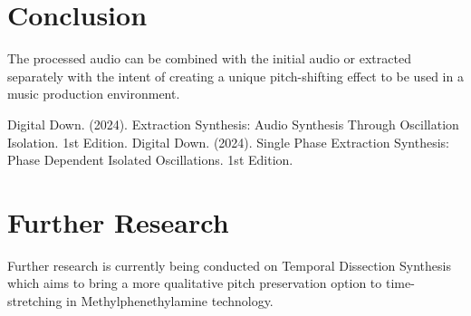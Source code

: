 \documentclass[12pt,a4paper]{article}
\begin{document}
\section{Conclusion}
The processed audio can be combined with the initial audio or extracted separately with the intent of creating a unique pitch-shifting effect to be used in a music production environment.

\begin{thebibliography}{9}
 Digital Down. (2024). Extraction Synthesis: Audio Synthesis Through Oscillation Isolation. 1st Edition.
 Digital Down. (2024). Single Phase Extraction Synthesis: Phase Dependent Isolated Oscillations. 1st Edition.
\end{thebibliography}
\section*{Further Research}
Further research is currently being conducted on Temporal Dissection Synthesis which aims to bring a more qualitative pitch preservation option to time-stretching in Methylphenethylamine technology.
\end{document}
